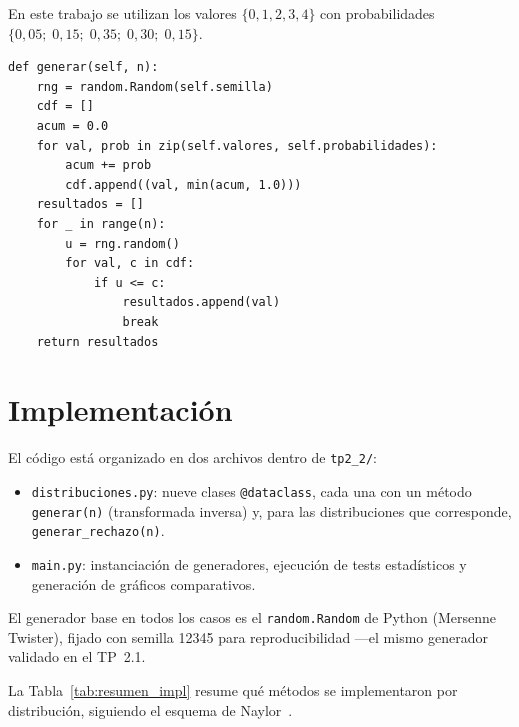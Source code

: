 \documentclass[a4paper, 11pt]{article}
\begin{document}
En este trabajo se utilizan los valores $\{0, 1, 2, 3, 4\}$ con probabilidades
$\{0{,}05;\; 0{,}15;\; 0{,}35;\; 0{,}30;\; 0{,}15\}$.

\begin{lstlisting}[style=python, caption={Generador Empírica Discreta — transformada inversa acumulada.}]
def generar(self, n):
    rng = random.Random(self.semilla)
    cdf = []
    acum = 0.0
    for val, prob in zip(self.valores, self.probabilidades):
        acum += prob
        cdf.append((val, min(acum, 1.0)))
    resultados = []
    for _ in range(n):
        u = rng.random()
        for val, c in cdf:
            if u <= c:
                resultados.append(val)
                break
    return resultados
\end{lstlisting}


\section{Implementación}

El código está organizado en dos archivos dentro de \texttt{tp2\_2/}:

\begin{itemize}
  \item \texttt{distribuciones.py}: nueve clases \texttt{@dataclass}, cada una
        con un método \texttt{generar(n)} (transformada inversa) y, para las
        distribuciones que corresponde, \texttt{generar\_rechazo(n)}.
  \item \texttt{main.py}: instanciación de generadores, ejecución de tests
        estadísticos y generación de gráficos comparativos.
\end{itemize}

El generador base en todos los casos es el \texttt{random.Random} de Python
(Mersenne Twister), fijado con semilla 12345 para reproducibilidad —el mismo
generador validado en el TP~2.1.

La Tabla~\ref{tab:resumen_impl} resume qué métodos se implementaron por
distribución, siguiendo el esquema de Naylor~\cite{naylor1982tecnicas}.
\end{document}
